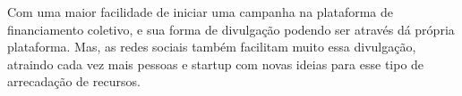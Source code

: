 \documentclass{classe_cn}                 %
\begin{document}
Com uma maior facilidade de iniciar uma campanha na plataforma de financiamento coletivo, e sua forma de divulgação podendo ser através dá própria plataforma. Mas, as redes sociais também facilitam muito essa divulgação, atraindo cada vez mais pessoas e startup com novas ideias para esse tipo de arrecadação de recursos.


\vspace{1.0cm}
\end{document}
